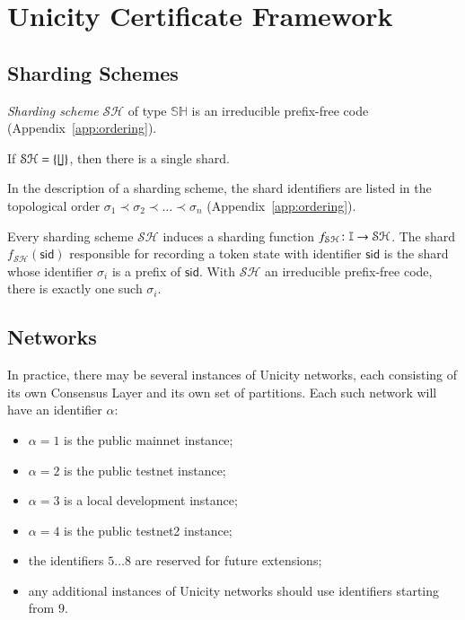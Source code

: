 \chapter{Unicity Certificate Framework}

\section{Sharding Schemes}\label{sec:sharding}

\emph{Sharding scheme} $\mathcal{SH}$ of type $\mathbb{SH}$ is an irreducible prefix-free code (Appendix~\ref{app:ordering}).

If $\mathcal{SH} = \{\lfloor\!\rfloor\}$, then there is a single shard.

In the description of a sharding scheme, the shard identifiers are listed in the topological order $\sigma_1 \prec \sigma_2 \prec \ldots \prec \sigma_n$ (Appendix~\ref{app:ordering}).

Every sharding scheme $\mathcal{SH}$ induces a sharding function $f_\mathcal{SH}\colon \mathbb{I}\to \mathcal{SH}$. The shard $f_\mathcal{SH}(\mathsf{sid})$ responsible for recording a token state with identifier $\mathsf{sid}$ is the shard whose identifier $\sigma_i$ is a prefix of $\mathsf{sid}$. With $\mathcal{SH}$ an irreducible prefix-free code, there is exactly one such $\sigma_i$.

\section{Networks}\label{sec:networks}

In practice, there may be several instances of Unicity networks, each consisting of its own Consensus Layer and its own set of partitions. Each such network will have an identifier $\alpha$:

\begin{itemize}
\item $\alpha = 1$ is the public mainnet instance;
\item $\alpha = 2$ is the public testnet instance;
\item $\alpha = 3$ is a local development instance;
\item $\alpha = 4$ is the public testnet2 instance;
\item the identifiers $5 \ldots 8$ are reserved for future extensions;
\item any additional instances of Unicity networks should use identifiers starting from $9$.
\end{itemize}

